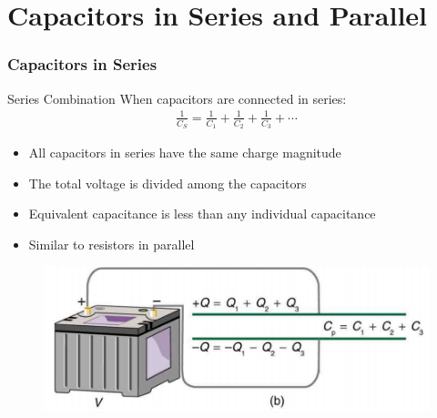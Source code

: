 \documentclass{beamer}
\begin{document}
\section{Capacitors in Series and Parallel}

\begin{frame}
    \frametitle{Capacitors in Series}
    
    \begin{block}{Series Combination}
        When capacitors are connected in series:
        \begin{align}
            \frac{1}{C_S} = \frac{1}{C_1} + \frac{1}{C_2} + \frac{1}{C_3} + \cdots
        \end{align}
    \end{block}
    
    \begin{itemize}
        \item All capacitors in series have the same charge magnitude
        \item The total voltage is divided among the capacitors
        \item Equivalent capacitance is less than any individual capacitance
        \item Similar to resistors in parallel
    \end{itemize}
    
    \begin{center}
        \begin{figure}
            \centering
            \includegraphics[width=0.3\linewidth]{phys12-circuits-capacitor-in-series.png}
        \end{figure}
    \end{center}
\end{frame}
\end{document}
